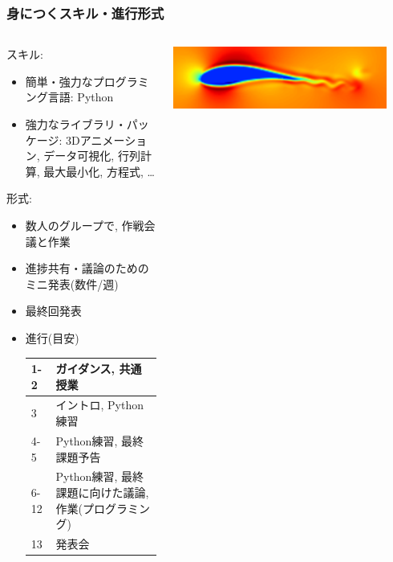 \documentclass[10pt,dvipdfmx]{beamer}
\newcommand{\ao}[1]{{\color{blue}#1}}
\begin{document}
\begin{frame}
\frametitle{身につくスキル・進行形式}
\begin{columns}
  \begin{column}{0.6\textwidth}

    スキル:
    \begin{itemize}
    \item 簡単・強力な\ao{プログラミング言語: Python}
    \item 強力な\ao{ライブラリ・パッケージ:}
      3Dアニメーション, データ可視化, 行列計算, 最大最小化, 方程式, \ldots
    \end{itemize}

    形式:
    \begin{itemize}
    \item 数人のグループで, 作戦会議と作業
    \item 進捗共有・議論のためのミニ発表(数件/週)
    \item 最終回発表
    \item 進行(目安) 
      
      {\scriptsize \begin{tabular}{|l|l|}\hline
          1-2  & ガイダンス, 共通授業 \\\hline
          3    & イントロ, Python練習 \\\hline
          4-5  & Python練習, 最終課題予告 \\\hline
          6-12 & Python練習, 最終課題に向けた議論, 作業(プログラミング) \\\hline
          13   & 発表会 \\\hline
        \end{tabular}}
    \end{itemize}

  \end{column}

  \begin{column}{0.4\textwidth}
    \begin{center}
    \includegraphics[width=0.9\textwidth]{out/pdf/img/wing2.pdf}


\end{center}
\end{column}
\end{columns}
\end{frame}
\end{document}

